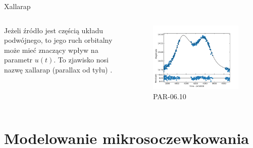 \documentclass{beamer}
\begin{document}
\begin{frame}{Xallarap}
    \begin{columns}
        \begin{column}{0.5\linewidth}
            Jeżeli źródło jest częścią układu podwójnego, to jego ruch orbitalny może mieć znaczący wpływ na parametr $u(t)$.
            To zjawisko nosi nazwę xallarap (parallax od tyłu) \cite{Xallarap_paper}.
        \end{column}
        \begin{column}{0.5\linewidth}
            \begin{figure}
                \centering
                \includegraphics[width = \textwidth]{../sim30/xallarap/png/PAR-06-noaver.dat.10.png}
                \caption*{\tiny{PAR-06.10}}
            \end{figure}
        \end{column}
    \end{columns}
\end{frame}

\section{Modelowanie mikrosoczewkowania}
\end{document}
